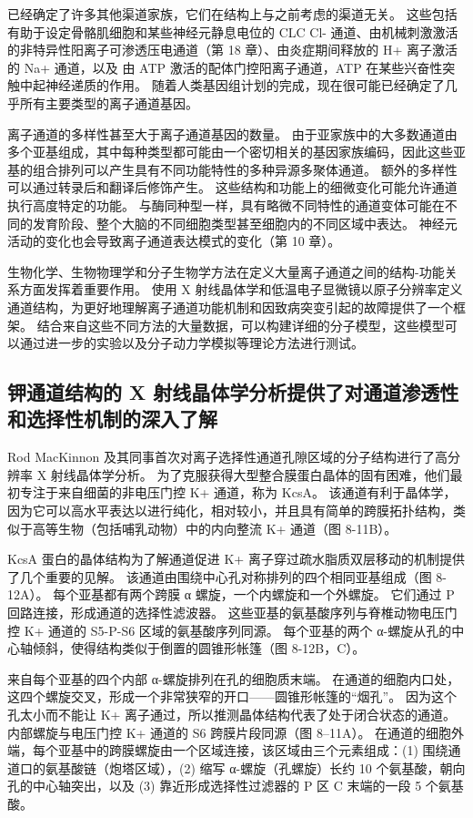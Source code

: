 已经确定了许多其他渠道家族，它们在结构上与之前考虑的渠道无关。 这些包括有助于设定骨骼肌细胞和某些神经元静息电位的 CLC Cl- 通道、由机械刺激激活的非特异性阳离子可渗透压电通道（第 18 章）、由炎症期间释放的 H+ 离子激活的 Na+ 通道，以及 由 ATP 激活的配体门控阳离子通道，ATP 在某些兴奋性突触中起神经递质的作用。 随着人类基因组计划的完成，现在很可能已经确定了几乎所有主要类型的离子通道基因。

离子通道的多样性甚至大于离子通道基因的数量。 由于亚家族中的大多数通道由多个亚基组成，其中每种类型都可能由一个密切相关的基因家族编码，因此这些亚基的组合排列可以产生具有不同功能特性的多种异源多聚体通道。 额外的多样性可以通过转录后和翻译后修饰产生。 这些结构和功能上的细微变化可能允许通道执行高度特定的功能。 与酶同种型一样，具有略微不同特性的通道变体可能在不同的发育阶段、整个大脑的不同细胞类型甚至细胞内的不同区域中表达。 神经元活动的变化也会导致离子通道表达模式的变化（第 10 章）。

生物化学、生物物理学和分子生物学方法在定义大量离子通道之间的结构-功能关系方面发挥着重要作用。 使用 X 射线晶体学和低温电子显微镜以原子分辨率定义通道结构，为更好地理解离子通道功能机制和因致病突变引起的故障提供了一个框架。 结合来自这些不同方法的大量数据，可以构建详细的分子模型，这些模型可以通过进一步的实验以及分子动力学模拟等理论方法进行测试。




\subsection{钾通道结构的 X 射线晶体学分析提供了对通道渗透性和选择性机制的深入了解}
Rod MacKinnon 及其同事首次对离子选择性通道孔隙区域的分子结构进行了高分辨率 X 射线晶体学分析。 为了克服获得大型整合膜蛋白晶体的固有困难，他们最初专注于来自细菌的非电压门控 K+ 通道，称为 KcsA。 该通道有利于晶体学，因为它可以高水平表达以进行纯化，相对较小，并且具有简单的跨膜拓扑结构，类似于高等生物（包括哺乳动物）中的内向整流 K+ 通道（图 8-11B）。

KcsA 蛋白的晶体结构为了解通道促进 K+ 离子穿过疏水脂质双层移动的机制提供了几个重要的见解。 该通道由围绕中心孔对称排列的四个相同亚基组成（图 8-12A）。 每个亚基都有两个跨膜 α 螺旋，一个内螺旋和一个外螺旋。 它们通过 P 回路连接，形成通道的选择性滤波器。 这些亚基的氨基酸序列与脊椎动物电压门控 K+ 通道的 S5-P-S6 区域的氨基酸序列同源。 每个亚基的两个 α-螺旋从孔的中心轴倾斜，使得结构类似于倒置的圆锥形帐篷（图 8-12B，C）。

来自每个亚基的四个内部 α-螺旋排列在孔的细胞质末端。 在通道的细胞内口处，这四个螺旋交叉，形成一个非常狭窄的开口——圆锥形帐篷的“烟孔”。 因为这个孔太小而不能让 K+ 离子通过，所以推测晶体结构代表了处于闭合状态的通道。 内部螺旋与电压门控 K+ 通道的 S6 跨膜片段同源（图 8–11A）。 在通道的细胞外端，每个亚基中的跨膜螺旋由一个区域连接，该区域由三个元素组成：(1) 围绕通道口的氨基酸链（炮塔区域），(2) 缩写 α-螺旋（孔螺旋）长约 10 个氨基酸，朝向孔的中心轴突出，以及 (3) 靠近形成选择性过滤器的 P 区 C 末端的一段 5 个氨基酸。

